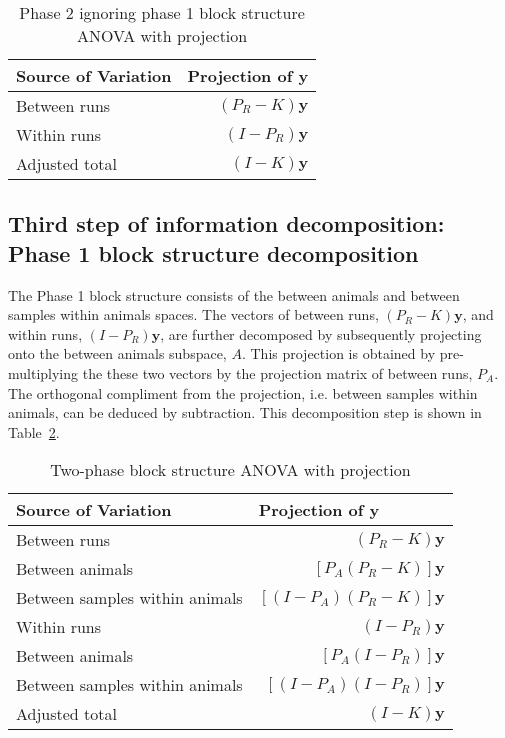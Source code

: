 \documentclass[article]{jss}
\begin{document}
\begin{table}[ht]
\centering
\caption{Phase 2 ignoring phase 1 block structure ANOVA with projection} 
\begin{tabular}[t]{lr}
\hline
\multicolumn{1}{l}{Source of Variation}  & \multicolumn{1}{l}{Projection of $\bm{y}$}\\
\hline
Between runs 					&$(P_R - K)\bm{y}$ \\
Within runs 					&$(I-P_R)\bm{y}$ \\
\hline
Adjusted total  				&$(I-K)\bm{y}$  \\
\hline
\end{tabular}
\label{tab:block2Projection}
\end{table}

\subsection{Third step of information decomposition: Phase 1 block structure decomposition}
The Phase 1 block structure consists of the between animals and between samples within animals spaces. The vectors of between runs, $(P_R - K)\bm{y}$, and within runs, $(I-P_R)\bm{y}$, are further decomposed by subsequently projecting onto the between animals subspace, $A$. This projection is obtained by pre-multiplying the these two vectors by the projection matrix of between runs, $P_{A}$. The orthogonal compliment from the projection, i.e. between samples within animals, can be deduced by subtraction. This decomposition step is shown in Table~\ref{tab:block1Projection}.

\begin{table}[ht]
\centering
\caption{Two-phase block structure ANOVA with projection} 
\begin{tabular}[t]{lr}
\hline
\multicolumn{1}{l}{Source of Variation}  & \multicolumn{1}{l}{Projection of $\bm{y}$}\\
\hline
Between runs 					&$(P_R - K)\bm{y}$ \\
\hspace{3mm}Between animals & $[P_{A}(P_R - K)]\bm{y}$ 	\\
\hspace{3mm}Between samples within animals		& $[(I - P_{A})(P_R - K)]\bm{y}$ \\
\hline
Within runs 					&$(I-P_R)\bm{y}$ \\
\hspace{3mm}Between animals & $[P_{A}(I-P_R)]\bm{y}$\\
\hspace{3mm}Between samples within animals		&$[(I - P_{A})(I-P_R)]\bm{y}$ \\
\hline
Adjusted total  				&$(I-K)\bm{y}$  \\
\hline
\end{tabular}
\label{tab:block1Projection}
\end{table}
\end{document}
